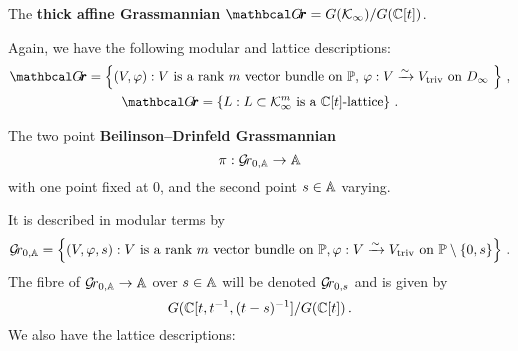 \documentclass{article} %
\begin{document}
% 
\begin{definition}
\label{def:grth}
The \textbf{thick affine Grassmannian} $\Grth = G(\Kinf)/G(\CC[t])$.
\end{definition}
Again, we have the following modular and lattice descriptions:
\begin{gather*}
\Grth = 
    \left\{ 
        (V, \varphi) : \text{$V$ is a rank $m$ vector bundle on $ \PP $, $\varphi : V \xrightarrow{\sim} \Vtriv $ on $ D_\infty $ } 
    \right\}\,, \\
\Grth = 
    \left\{ 
        L : L \subset  \Kinf^m \text{ is a $\CC[t]$-lattice} 
    \right\}\,.
\end{gather*}
% 
\begin{definition} 
\label{def:bdgr}
The two point \textbf{Beilinson--Drinfeld Grassmannian} $$\pi : \Grbd\to \AA$$ with one point fixed at 0, and the second point $s\in\AA$ varying.
\end{definition}
% 
It is described in modular terms by 
$$
\Grbd = 
    \left\{ 
        (V,\varphi,s) : V\text{ is a rank $m$ vector bundle on }\PP, \varphi : V \xrightarrow{\sim} \Vtriv \text{ on } \PP \setminus \{0, s\}  
    \right\}\,. 
$$
% 
The fibre of $\Grbd \to \AA$ over $ s \in \AA $ will be denoted $ \Gr_{0,s} $ and is given by
% 
$$ 
    G(\CC[t, t^{-1}, (t-s)^{-1}]/G(\CC[t])\,. %
$$
% 
We also have the lattice descriptions:
\end{document}
